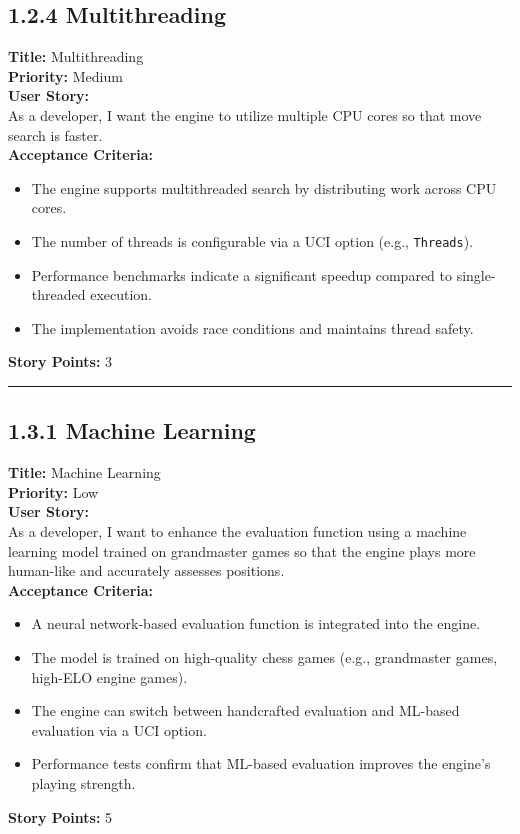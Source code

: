 \documentclass[12pt]{article}
\begin{document}
\subsection{1.2.4 Multithreading}
\textbf{Title:} Multithreading\\
\textbf{Priority:} Medium\\
\textbf{User Story:}\\
As a developer, I want the engine to utilize multiple CPU cores so that move search is faster.\\
\textbf{Acceptance Criteria:}
\begin{itemize}
    \item The engine supports multithreaded search by distributing work across CPU cores.
    \item The number of threads is configurable via a UCI option (e.g., \texttt{Threads}).
    \item Performance benchmarks indicate a significant speedup compared to single-threaded execution.
    \item The implementation avoids race conditions and maintains thread safety.
\end{itemize}
\textbf{Story Points:} 3

\bigskip
\hrule
\bigskip

\newpage
\subsection{1.3.1 Machine Learning}
\textbf{Title:} Machine Learning\\
\textbf{Priority:} Low\\
\textbf{User Story:}\\
As a developer, I want to enhance the evaluation function using a machine learning model trained on grandmaster games so that the engine plays more human-like and accurately assesses positions.\\
\textbf{Acceptance Criteria:}
\begin{itemize}
    \item A neural network-based evaluation function is integrated into the engine.
    \item The model is trained on high-quality chess games (e.g., grandmaster games, high-ELO engine games).
    \item The engine can switch between handcrafted evaluation and ML-based evaluation via a UCI option.
    \item Performance tests confirm that ML-based evaluation improves the engine’s playing strength.
\end{itemize}
\textbf{Story Points:} 5
\end{document}
